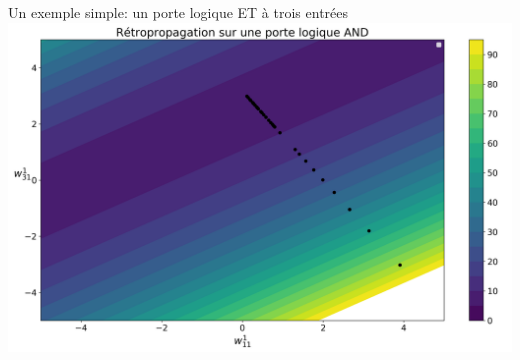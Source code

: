 \documentclass[ignorenonframetext,]{beamer}
\begin{document}
\begin{frame}{Un exemple simple: un porte logique ET à trois entrées}
    \includegraphics{graph.png}
\end{frame}

%
%
%
%
%
%
%
%
%
%
%
%
%
%
%
%
%
%
%
%
%
%
%
%
\end{document}
